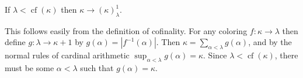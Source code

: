 \documentclass[12pt]{article}
\begin{document}
If $\lambda<\operatorname{cf}(\kappa)$ then $\kappa\rightarrow(\kappa)^1_\lambda$.

This follows easily from the definition of cofinality.  For any coloring $f:\kappa\rightarrow\lambda$ then define $g:\lambda\rightarrow\kappa+1$ by $g(\alpha)=|f^{-1}(\alpha)|$.  Then $\kappa=\sum_{\alpha<\lambda} g(\alpha)$, and by the normal rules of cardinal arithmetic $\operatorname{sup}_{\alpha<\lambda} g(\alpha)=\kappa$.  Since $\lambda<\operatorname{cf}(\kappa)$, there must be some $\alpha<\lambda$ such that $g(\alpha)=\kappa$.
\end{document}
